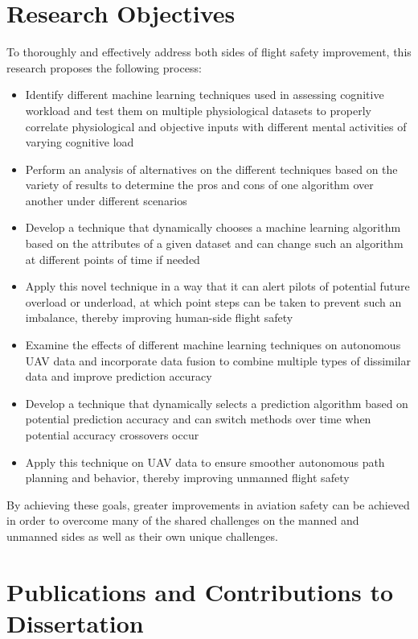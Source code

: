 \documentclass[12pt]{uthesis-v12}  %
\begin{document}
\section{Research Objectives}

To thoroughly and effectively address both sides of flight safety improvement, this research proposes the following process:
\begin{itemize}
\item Identify different machine learning techniques used in assessing cognitive workload and test them on multiple physiological datasets to properly correlate physiological and objective inputs with different mental activities of varying cognitive load
\item Perform an analysis of alternatives on the different techniques based on the variety of results to determine the pros and cons of one algorithm over another under different scenarios
\item Develop a technique that dynamically chooses a machine learning algorithm based on the attributes of a given dataset and can change such an algorithm at different points of time if needed
\item Apply this novel technique in a way that it can alert pilots of potential future overload or underload, at which point steps can be taken to prevent such an imbalance, thereby improving human-side flight safety
\item Examine the effects of different machine learning techniques on autonomous UAV data and incorporate data fusion to combine multiple types of dissimilar data and improve prediction accuracy
\item Develop a technique that dynamically selects a prediction algorithm based on potential prediction accuracy and can switch methods over time when potential accuracy crossovers occur
\item Apply this technique on UAV data to ensure smoother autonomous path planning and behavior, thereby improving unmanned flight safety
\end{itemize}
By achieving these goals, greater improvements in aviation safety can be achieved in order to overcome many of the shared challenges on the manned and unmanned sides as well as their own unique challenges. 

\section{Publications and Contributions to Dissertation}
\end{document}
